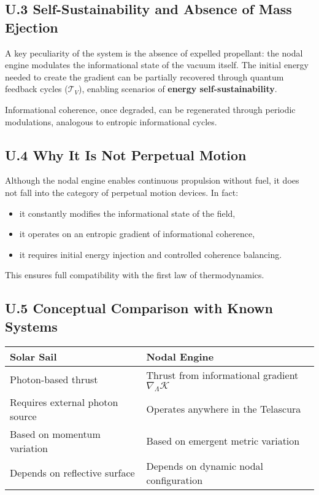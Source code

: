 \documentclass[12pt]{article}
\begin{document}
\subsection*{U.3 Self-Sustainability and Absence of Mass Ejection}

A key peculiarity of the system is the absence of expelled propellant: the nodal engine modulates the informational state of the vacuum itself. The initial energy needed to create the gradient can be partially recovered through quantum feedback cycles ($\mathcal{T}_V$), enabling scenarios of \textbf{energy self-sustainability}.

Informational coherence, once degraded, can be regenerated through periodic modulations, analogous to entropic informational cycles.

\subsection*{U.4 Why It Is Not Perpetual Motion}

Although the nodal engine enables continuous propulsion without fuel, it does not fall into the category of perpetual motion devices. In fact:

\begin{itemize}
    \item it constantly modifies the informational state of the field,
    \item it operates on an entropic gradient of informational coherence,
    \item it requires initial energy injection and controlled coherence balancing.
\end{itemize}

This ensures full compatibility with the first law of thermodynamics.

\subsection*{U.5 Conceptual Comparison with Known Systems}

\begin{table}[H]
\centering
\begin{tabular}{ll}
\toprule
\textbf{Solar Sail} & \textbf{Nodal Engine} \\
\midrule
Photon-based thrust & Thrust from informational gradient $\nabla_\Lambda \mathcal{K}$ \\
Requires external photon source & Operates anywhere in the Telascura \\
Based on momentum variation & Based on emergent metric variation \\
Depends on reflective surface & Depends on dynamic nodal configuration \\
\bottomrule
\end{tabular}
\end{table}
\end{document}
